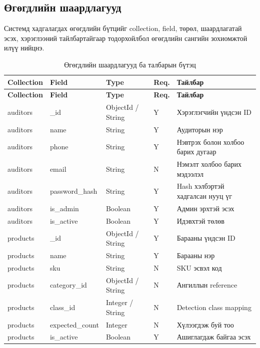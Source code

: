 \subsection{Өгөгдлийн шаардлагууд}

Системд хадгалагдах өгөгдлийн бүтцийг collection, field, төрөл, шаардлагатай эсэх, хэрэглээний тайлбартайгаар тодорхойлбол өгөгдлийн сангийн зохиомжтой илүү нийцнэ.

\begingroup
\footnotesize
\setlength{\tabcolsep}{3pt}
\renewcommand{\arraystretch}{1.04}
\begin{longtable}{|P{0.14}|P{0.22}|P{0.15}|P{0.06}|P{0.35}|}
\caption{Өгөгдлийн шаардлагууд ба талбарын бүтэц}
\label{tab:data_requirements} \\
\hline
\textbf{Collection} & \textbf{Field} & \textbf{Type} & \textbf{Req.} & \textbf{Тайлбар} \\
\hline
\endfirsthead
\hline
\textbf{Collection} & \textbf{Field} & \textbf{Type} & \textbf{Req.} & \textbf{Тайлбар} \\
\hline
\endhead
\hline
\endfoot
auditors & \_id & ObjectId / String & Y & Хэрэглэгчийн үндсэн ID \\
\hline
auditors & name & String & Y & Аудиторын нэр \\
\hline
auditors & phone & String & Y & Нэвтрэх болон холбоо барих дугаар \\
\hline
auditors & email & String & N & Нэмэлт холбоо барих мэдээлэл \\
\hline
auditors & password\_hash & String & Y & Hash хэлбэртэй хадгалсан нууц үг \\
\hline
auditors & is\_admin & Boolean & Y & Админ эрхтэй эсэх \\
\hline
auditors & is\_active & Boolean & Y & Идэвхтэй төлөв \\
\hline
products & \_id & ObjectId / String & Y & Барааны үндсэн ID \\
\hline
products & name & String & Y & Барааны нэр \\
\hline
products & sku & String & N & SKU эсвэл код \\
\hline
products & category\_id & ObjectId / String & N & Ангиллын reference \\
\hline
products & class\_id & Integer / String & N & Detection class mapping \\
\hline
products & expected\_count & Integer & N & Хүлээгдэж буй тоо \\
\hline
products & is\_active & Boolean & Y & Ашиглагдаж байгаа эсэх \\

\end{longtable}
